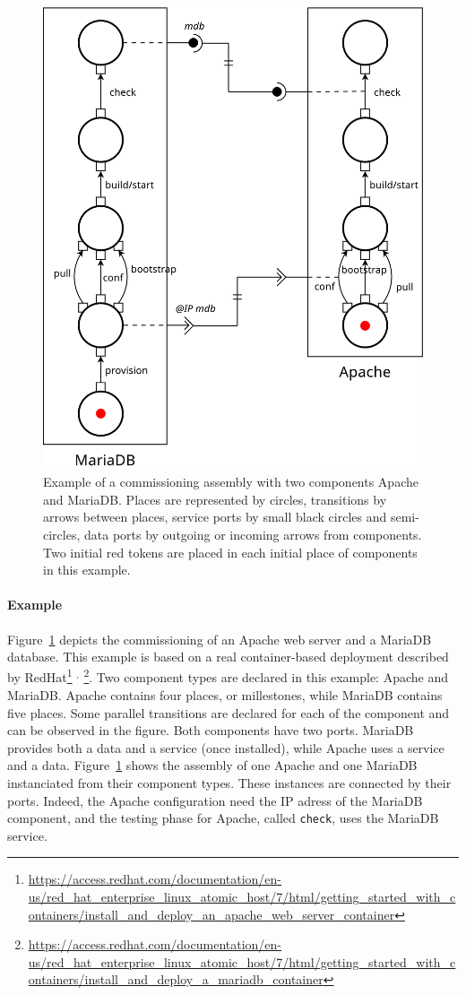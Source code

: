 \begin{figure}[tbp]
  \begin{center}
    \includegraphics[width=0.7\linewidth]{./images/apachebdd.pdf}
  \end{center}
  \caption{Example of a commissioning assembly with two components
    Apache and MariaDB. Places are represented by circles, transitions
    by arrows between places, service ports by small black circles and
    semi-circles, data ports by outgoing or incoming arrows from
    components. Two initial red tokens are placed in each initial
    place of components in this example.}
  \label{fig:example}
\end{figure}

\paragraph{Example}{ Figure~\ref{fig:example} depicts the \mad
  commissioning of an Apache web server and a MariaDB database. This
  example is based on a real container-based deployment described by
  RedHat\footnote{\url{https://access.redhat.com/documentation/en-us/red_hat_enterprise_linux_atomic_host/7/html/getting_started_with_containers/install_and_deploy_an_apache_web_server_container}}%
  $^,$%
  \footnote{\url{https://access.redhat.com/documentation/en-us/red_hat_enterprise_linux_atomic_host/7/html/getting_started_with_containers/install_and_deploy_a_mariadb_container}}. Two
  \mad component types are declared in this example: Apache
  and MariaDB. Apache contains four places, or millestones, while
  MariaDB contains five places. Some parallel transitions are declared
  for each of the component and can be observed in the figure. Both
  components have two ports. MariaDB provides both a data and a
  service (once installed), while Apache uses a service and a
  data. Figure~\ref{fig:example} shows the assembly of one Apache and
  one MariaDB instanciated from their component types. These instances
  are connected by their ports. Indeed, the Apache configuration need
  the IP adress of the MariaDB component, and the testing phase for
  Apache, called \texttt{check}, uses the MariaDB service.}


